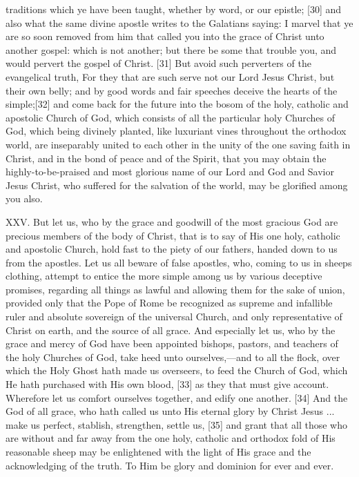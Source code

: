 traditions which ye have been taught, whether by word, or our
epistle\textquotesingle; {[}30{]} and also what the same divine apostle
writes to the Galatians saying: \textquotesingle I marvel that ye are so
soon removed from him that called you into the grace of Christ unto
another gospel: which is not another; but there be some that trouble
you, and would pervert the gospel of Christ.\textquotesingle{} {[}31{]}
But avoid such perverters of the evangelical truth, \textquotesingle For
they that are such serve not our Lord Jesus Christ, but their own belly;
and by good words and fair speeches deceive the hearts of the
simple;{[}32{]} and come back for the future into the bosom of the holy,
catholic and apostolic Church of God, which consists of all the
particular holy Churches of God, which being divinely planted, like
luxuriant vines throughout the orthodox world, are inseparably united to
each other in the unity of the one saving faith in Christ, and in the
bond of peace and of the Spirit, that you may obtain the
highly-to-be-praised and most glorious name of our Lord and God and
Savior Jesus Christ, who suffered for the salvation of the world, may be
glorified among you also.

XXV. But let us, who by the grace and goodwill of the most gracious God
are precious members of the body of Christ, that is to say of His one
holy, catholic and apostolic Church, hold fast to the piety of our
fathers, handed down to us from the apostles. Let us all beware of false
apostles, who, coming to us in sheep\textquotesingle s clothing, attempt
to entice the more simple among us by various deceptive promises,
regarding all things as lawful and allowing them for the sake of union,
provided only that the Pope of Rome be recognized as supreme and
infallible ruler and absolute sovereign of the universal Church, and
only representative of Christ on earth, and the source of all grace. And
especially let us, who by the grace and mercy of God have been appointed
bishops, pastors, and teachers of the holy Churches of God,
\textquotesingle take heed unto ourselves,---and to all the flock, over
which the Holy Ghost hath made us overseers, to feed the Church of God,
which He hath purchased with His own blood,\textquotesingle{} {[}33{]}
as they that must give account. \textquotesingle Wherefore let us
comfort ourselves together, and edify one another.\textquotesingle{}
{[}34{]} \textquotesingle And the God of all grace, who hath called us
unto His eternal glory by Christ Jesus ... make us perfect, stablish,
strengthen, settle us,\textquotesingle{} {[}35{]} and grant that all
those who are without and far away from the one holy, catholic and
orthodox fold of His reasonable sheep may be enlightened with the light
of His grace and the acknowledging of the truth. To Him be glory and
dominion for ever and ever.

